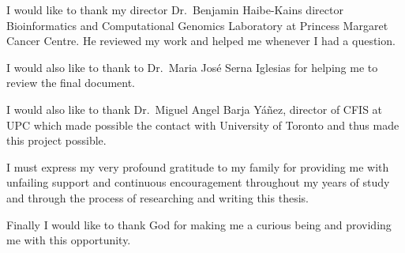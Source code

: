 

I would like to thank my director Dr.~Benjamin Haibe-Kains director Bioinformatics and 
Computational Genomics Laboratory at Princess Margaret Cancer 
Centre. He reviewed my work and helped me whenever I had a question.

I would also like to thank to Dr.~Maria José Serna Iglesias for helping me to review the 
final document.

I would also like to thank Dr.~Miguel Angel Barja Yáñez, director of CFIS at UPC which 
made possible the contact with University of Toronto and thus made this project possible.

I must express my very profound gratitude to my family for providing me with unfailing 
support and continuous encouragement throughout my years of study and through the process 
of researching and writing this thesis. 

Finally I would like to thank God for making me a curious being and providing me with 
this opportunity.


